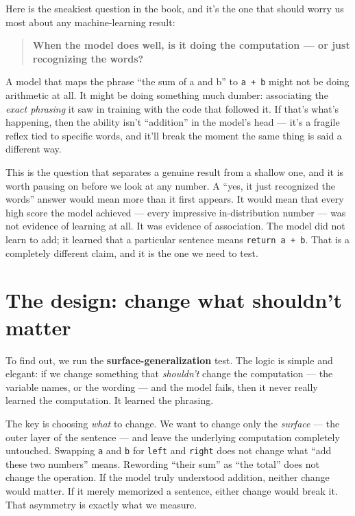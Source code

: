 Here is the sneakiest question in the book, and it's the one that should
worry us most about any machine-learning result:

\begin{quote}
\textbf{When the model does well, is it doing the computation --- or
just recognizing the words?}
\end{quote}

A model that maps the phrase ``the sum of a and b'' to \texttt{a\ +\ b}
might not be doing arithmetic at all. It might be doing something much
dumber: associating the \emph{exact phrasing} it saw in training with
the code that followed it. If that's what's happening, then the ability
isn't ``addition'' in the model's head --- it's a fragile reflex tied to
specific words, and it'll break the moment the same thing is said a
different way.

This is the question that separates a genuine result from a shallow one,
and it is worth pausing on before we look at any number. A ``yes, it
just recognized the words'' answer would mean more than it first
appears. It would mean that every high score the model achieved ---
every impressive in-distribution number --- was not evidence of learning
at all. It was evidence of association. The model did not learn to add;
it learned that a particular sentence means \texttt{return\ a\ +\ b}.
That is a completely different claim, and it is the one we need to test.

\section{The design: change what shouldn't
matter}\label{the-design-change-what-shouldnt-matter}

To find out, we run the \textbf{surface-generalization} test. The logic
is simple and elegant: if we change something that \emph{shouldn't}
change the computation --- the variable names, or the wording --- and
the model fails, then it never really learned the computation. It
learned the phrasing.

The key is choosing \emph{what} to change. We want to change only the
\emph{surface} --- the outer layer of the sentence --- and leave the
underlying computation completely untouched. Swapping \texttt{a} and
\texttt{b} for \texttt{left} and \texttt{right} does not change what
``add these two numbers'' means. Rewording ``their sum'' as ``the
total'' does not change the operation. If the model truly understood
addition, neither change would matter. If it merely memorized a
sentence, either change would break it. That asymmetry is exactly what
we measure.

